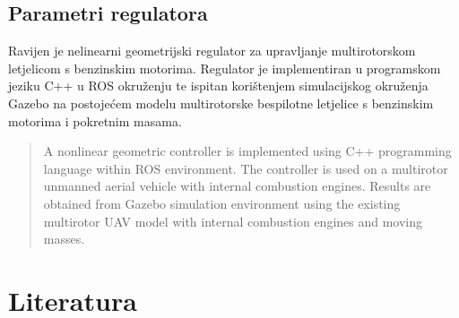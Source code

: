 \documentclass[times, utf8, diplomski]{fer}
\begin{document}
	\newpage
	\clearpage
	
	\section{Parametri regulatora}
\begin{sazetak}
Ravijen je nelinearni geometrijski regulator za upravljanje multirotorskom letjelicom s benzinskim motorima. Regulator je implementiran u programskom jeziku C++ u ROS okruženju te ispitan korištenjem simulacijskog okruženja Gazebo na postojećem modelu multirotorske bespilotne letjelice s benzinskim motorima i pokretnim masama.

\end{sazetak}

\begin{abstract}
A nonlinear geometric controller is implemented using C++ programming language within ROS environment. The controller is used on a multirotor unmanned aerial vehicle with internal combustion engines. Results are obtained from Gazebo simulation environment using the existing multirotor UAV model with internal combustion engines and moving masses.

\end{abstract}





\chapter{Literatura}
\end{document}
